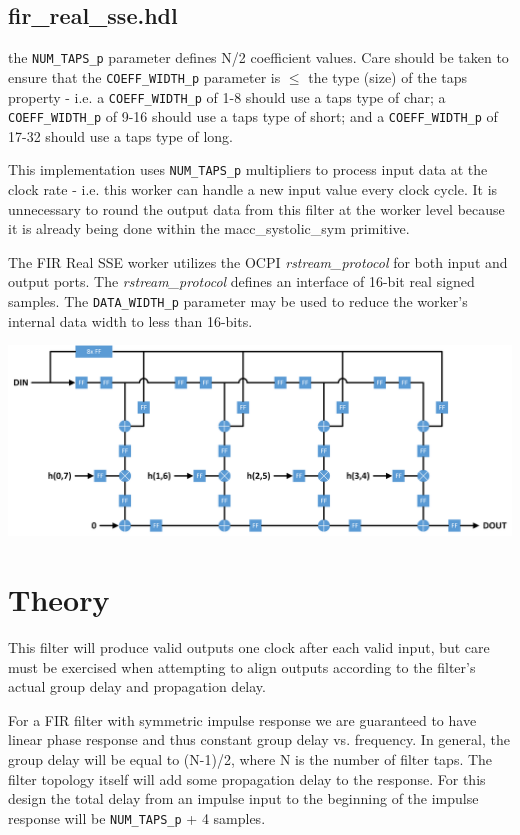 \documentclass{article}
\def\comp{fir\_real\_sse}
\begin{document}
\subsection*{\comp.hdl}
\begin{flushleft}
	the \verb+NUM_TAPS_p+ parameter defines N/2 coefficient values. Care should be taken to ensure that the \verb+COEFF_WIDTH_p+ parameter is $\le$ the type (size) of the taps property - i.e. a \verb+COEFF_WIDTH_p+ of 1-8 should use a taps type of char; a \verb+COEFF_WIDTH_p+ of 9-16 should use a taps type of short; and a \verb+COEFF_WIDTH_p+ of 17-32 should use a taps type of long.\medskip

	This implementation uses \verb+NUM_TAPS_p+ multipliers to process input data at the clock rate - i.e. this worker can handle a new input value every clock cycle. It is unnecessary to round the output data from this filter at the worker level because it is already being done within the macc\_systolic\_sym primitive.\medskip

	The FIR Real SSE worker utilizes the OCPI \textit{rstream\_protocol} for both input and output ports. The \textit{rstream\_protocol} defines an interface of 16-bit real signed samples. The \verb+DATA_WIDTH_p+ parameter may be used to reduce the worker's internal data width to less than 16-bits.
\end{flushleft}
{\centering\captionsetup{type=figure}\includegraphics[scale=0.65]{fir_systolic_sym_even}\par{}\label{fig:circuit}}

\section*{Theory}
\begin{flushleft}
	This filter will produce valid outputs one clock after each valid input, but care must be exercised when attempting to align outputs according to the filter's actual group delay and propagation delay.\medskip

	For a FIR filter with symmetric impulse response we are guaranteed to have linear phase response and thus constant group delay vs. frequency. In general, the group delay will be equal to (N-1)/2, where N is the number of filter taps.	The filter topology itself will add some propagation delay to the response. For this design the total delay from an impulse input to the beginning of the impulse response will be \verb+NUM_TAPS_p+ + 4 samples.
\end{flushleft}
\end{document}
